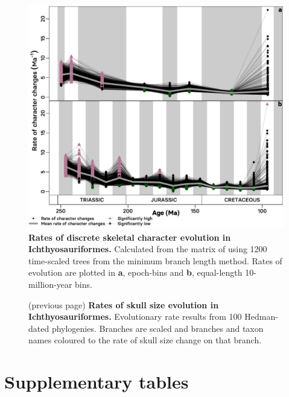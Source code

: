 \documentclass[british,a4paper]{article}
\begin{document}
\begin{figure}[h]
    \includegraphics[width = \textwidth, center]{supp_figures/figS8-rates_MBLspaghetti}
    \caption[Rates of discrete skeletal character evolution in
    Ichthyosauriformes]{\textbf{Rates of discrete skeletal character evolution in
    Ichthyosauriformes.} Calculated from the matrix of \textcite{Moon2018JSP} using
    1200 time-scaled trees from the minimum branch length method. Rates of evolution
    are plotted in \textbf{a}, epoch-bins and \textbf{b}, equal-length
    10-million-year bins.\label{fig:mbl-discrete-rates}}
\end{figure}
 
\begin{figure}[h]
    \caption[Rates of skull size evolution in Ichthyosauriformes]{(previous
    page) \textbf{Rates of skull size evolution in Ichthyosauriformes.}
    Evolutionary rate results from 100 Hedman-dated phylogenies. Branches are scaled
    and branches and taxon names coloured to the rate of skull size change on that
    branch.} 
\end{figure} 
\FloatBarrier



\restoregeometry

\section{Supplementary tables}\label{supplementary-tables}
\end{document}

